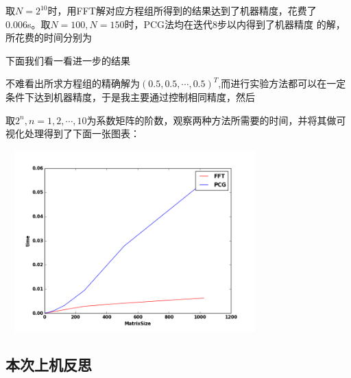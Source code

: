 \documentclass[10pt,a4paper]{ctexart}
\begin{document}
取$N=2^{10}$时，用FFT解对应方程组所得到的结果达到了机器精度，花费了0.006s。取$N=100,N=150$时，PCG法均在迭代8步以内得到了机器精度
的解，所花费的时间分别为

下面我们看一看进一步的结果

不难看出所求方程组的精确解为$(0.5,0.5,\cdots,0.5)^T$,而进行实验方法都可以在一定条件下达到机器精度，于是我主要通过控制相同精度，然后

取$2^{n},n=1,2,\cdots,10$为系数矩阵的阶数，观察两种方法所需要的时间，并将其做可视化处理得到了下面一张图表：
\par
\centerline{\includegraphics[height=7cm,width=10cm]{fft1.png}}
\par
\subsection{本次上机反思}
\end{document}
